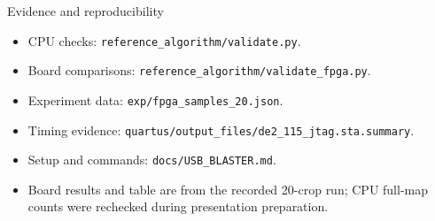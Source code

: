 \documentclass[aspectratio=169,10pt]{beamer}
\begin{document}
\begin{frame}{Evidence and reproducibility}
\small
\begin{itemize}
\item CPU checks: \texttt{reference\_algorithm/validate.py}.
\item Board comparisons: \texttt{reference\_algorithm/validate\_fpga.py}.
\item Experiment data: \texttt{exp/fpga\_samples\_20.json}.
\item Timing evidence: \texttt{quartus/output\_files/de2\_115\_jtag.sta.summary}.
\item Setup and commands: \texttt{docs/USB\_BLASTER.md}.
\item Board results and table are from the recorded 20-crop run; CPU full-map counts were rechecked during presentation preparation.
\end{itemize}
\end{frame}
\end{document}
